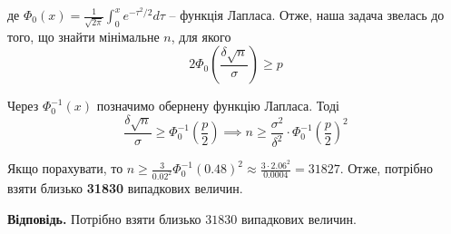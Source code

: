 \documentclass[oneside,solution]{karazin-prob-theory-assign}
\begin{document}
де $\Phi_0(x) = \frac{1}{\sqrt{2\pi}}\int_0^x e^{-\tau^2/2}d\tau$ -- функція Лапласа. Отже, наша задача звелась до того, що знайти мінімальне $n$, для якого
\begin{equation}
    2\Phi_0\left(\frac{\delta\sqrt{n}}{\sigma}\right) \geq p
\end{equation}

Через $\Phi_0^{-1}(x)$ позначимо обернену функцію Лапласа. Тоді
\begin{equation}
    \frac{\delta\sqrt{n}}{\sigma} \geq \Phi_0^{-1}\left(\frac{p}{2}\right) \implies \boxed{n \geq \frac{\sigma^2}{\delta^2}\cdot \Phi_0^{-1}\left(\frac{p}{2}\right)^2}
\end{equation}

Якщо порахувати, то $n \geq \frac{3}{0.02^2}\Phi_0^{-1}(0.48)^2 \approx \frac{3\cdot 2.06^2}{0.0004} = 31827$. Отже, потрібно взяти близько \textbf{31830} випадкових величин. 

\textbf{Відповідь.} Потрібно взяти близько $31830$ випадкових величин. 
\end{document}
